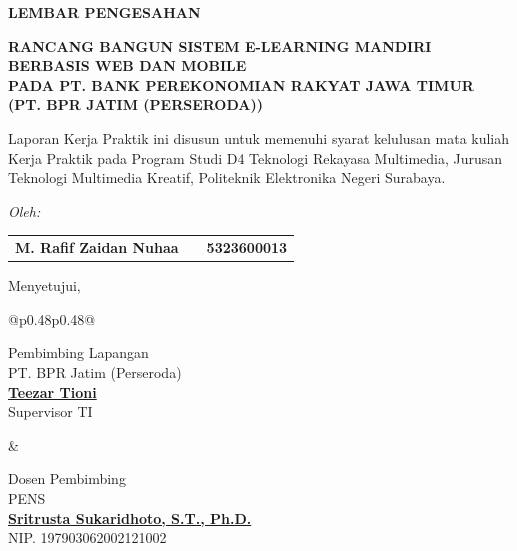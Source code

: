 \thispagestyle{empty}
\begin{center}
    {\fontsize{12pt}{14pt}\selectfont\textbf{LEMBAR PENGESAHAN}\par}
    \vspace{0.6cm}
    
    {\fontsize{11pt}{13pt}\selectfont\textbf{RANCANG BANGUN SISTEM E-LEARNING MANDIRI\\
    BERBASIS WEB DAN MOBILE\\
    PADA PT. BANK PEREKONOMIAN RAKYAT JAWA TIMUR\\
    (PT. BPR JATIM (PERSERODA))}\par}
    
    \vspace{0.8cm}
    
    {\fontsize{10pt}{12pt}\selectfont
    Laporan Kerja Praktik ini disusun untuk memenuhi syarat kelulusan mata kuliah Kerja Praktik pada Program Studi D4 Teknologi Rekayasa Multimedia, Jurusan Teknologi Multimedia Kreatif, Politeknik Elektronika Negeri Surabaya.
    \par}
    
    \vspace{0.6cm}
    
    \textit{Oleh:}\\
    \vspace{0.2cm}
    \begin{tabular}{ccc}
        \textbf{M. Rafif Zaidan Nuhaa} & \hspace{0.5cm} & \textbf{5323600013}
    \end{tabular}
    
    \vspace{0.8cm}
    
    Menyetujui,
    
    \vspace{0.3cm}
    
    \begin{tabular}{@{}p{0.48\textwidth}p{0.48\textwidth}@{}}
        \begin{minipage}{\linewidth}
            \centering
            {\fontsize{9pt}{11pt}\selectfont Pembimbing Lapangan\\
            PT. BPR Jatim (Perseroda)\\}
            \vspace{1.5cm}
            \underline{\textbf{\fontsize{10pt}{12pt}\selectfont Teezar Tioni}}\\
            {\fontsize{9pt}{11pt}\selectfont Supervisor TI}
        \end{minipage} &
        \begin{minipage}{\linewidth}
            \centering
            {\fontsize{9pt}{11pt}\selectfont Dosen Pembimbing\\
            PENS\\}
            \vspace{1.5cm}
            \underline{\textbf{\fontsize{10pt}{12pt}\selectfont Sritrusta Sukaridhoto, S.T., Ph.D.}}\\
            {\fontsize{9pt}{11pt}\selectfont NIP. 197903062002121002}
        \end{minipage}
    \end{tabular}
    

\end{center}
